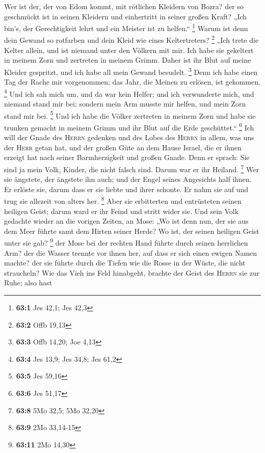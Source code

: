  Wer ist der, der von Edom kommt, mit rötlichen Kleidern
von Bozra? der so geschmückt ist in seinen Kleidern und einhertritt in
seiner großen Kraft? „Ich bin's, der Gerechtigkeit lehrt und ein Meister
ist zu helfen.`` \footnote{\textbf{63:1} Jes 42,1; Jes 42,3}
 Warum ist denn dein Gewand so rotfarben und dein Kleid
wie eines Keltertreters? \footnote{\textbf{63:2} Offb 19,13}
 „Ich trete die Kelter allein, und ist niemand unter den
Völkern mit mir. Ich habe sie gekeltert in meinem Zorn und zertreten in
meinem Grimm. Daher ist ihr Blut auf meine Kleider gespritzt, und ich
habe all mein Gewand besudelt. \footnote{\textbf{63:3} Offb 14,20; Joe
  4,13}  Denn ich habe einen Tag der Rache mir
vorgenommen; das Jahr, die Meinen zu erlösen, ist gekommen. \footnote{\textbf{63:4}
  Jes 13,9; Jes 34,8; Jes 61,2}  Und ich sah mich um, und
da war kein Helfer; und ich verwunderte mich, und niemand stand mir bei;
sondern mein Arm musste mir helfen, und mein Zorn stand mir bei.
\footnote{\textbf{63:5} Jes 59,16}  Und ich habe die
Völker zertreten in meinem Zorn und habe sie trunken gemacht in meinem
Grimm und ihr Blut auf die Erde geschüttet.`` \footnote{\textbf{63:6}
  Jes 51,17}  Ich will der Gnade des \textsc{Herrn}
gedenken und des Lobes des \textsc{Herrn} in allem, was uns der
\textsc{Herr} getan hat, und der großen Güte an dem Hause Israel, die er
ihnen erzeigt hat nach seiner Barmherzigkeit und großen Gnade.
 Denn er sprach: Sie sind ja mein Volk, Kinder, die nicht
falsch sind. Darum war er ihr Heiland. \footnote{\textbf{63:8} 5Mo 32,5;
  5Mo 32,20}  Wer sie ängstete, der ängstete ihn auch; und
der Engel seines Angesichts half ihnen. Er erlöste sie, darum dass er
sie liebte und ihrer schonte. Er nahm sie auf und trug sie allezeit von
alters her. \footnote{\textbf{63:9} 2Mo 33,14-15}  Aber
sie erbitterten und entrüsteten seinen heiligen Geist; darum ward er ihr
Feind und stritt wider sie.  Und sein Volk gedachte
wieder an die vorigen Zeiten, an Mose: „Wo ist denn nun, der sie aus dem
Meer führte samt dem Hirten seiner Herde? Wo ist, der seinen heiligen
Geist unter sie gab? \footnote{\textbf{63:11} 2Mo 14,30} 
der Mose bei der rechten Hand führte durch seinen herrlichen Arm? der
die Wasser trennte vor ihnen her, auf dass er sich einen ewigen Namen
machte?  der sie führte durch die Tiefen wie die Rosse in
der Wüste, die nicht straucheln?  Wie das Vieh ins Feld
hinabgeht, brachte der Geist des \textsc{Herrn} sie zur Ruhe; also hast
